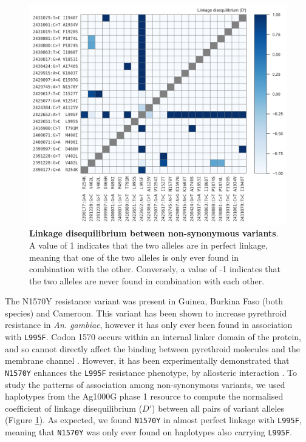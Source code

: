 \documentclass[a4paper,11pt,abstracton,hidelinks]{scrartcl}
\begin{document}
%
\begin{figure}[!t]

  \centering
  
  \includegraphics[width=\linewidth]{artwork/fig_ld.png}
  
  \caption{\textbf{Linkage disequilibrium between non-synonymous variants}. A value of 1 indicates that the two alleles are in perfect linkage, meaning that one of the two alleles is only ever found in combination with the other. Conversely, a value of -1 indicates that the two alleles are never found in combination with each other.}
  
  \label{fig:ld}
 
\end{figure}


%
The N1570Y resistance variant was present in Guinea, Burkina Faso (both species) and Cameroon.
%
This variant has been shown to increase pyrethroid resistance in \textit{An. gambiae}, however it has only ever been found in association with \texttt{L995F}.
%
Codon 1570 occurs within an internal linker domain of the protein, and so cannot directly affect the binding between pyrethroid molecules and the membrane channel \cite{Jones2012}.
%
However, it has been experimentally demonstrated that \texttt{N1570Y} enhances the \texttt{L995F} resistance phenotype, by allosteric interaction \cite{Wang2015}.
%
To study the patterns of association among non-synonymous variants, we used haplotypes from the Ag1000G phase 1 resource to compute the normalised coefficient  of linkage disequilibrium ($D'$) between all pairs of variant alleles (Figure \ref{fig:ld}).
%
As expected, we found \texttt{N1570Y} in almost perfect linkage with \texttt{L995F}, meaning that \texttt{N1570Y} was only ever found on haplotypes also carrying \texttt{L995F}.
\end{document}
